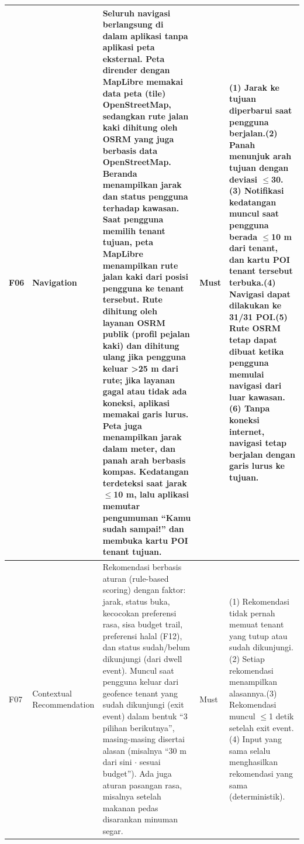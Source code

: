 \begin{longtable}{|L{0.075}|L{0.226}|L{0.299}|L{0.093}|L{0.307}|}
F06 & Navigation & Seluruh navigasi berlangsung di dalam aplikasi tanpa aplikasi peta eksternal. Peta dirender dengan MapLibre memakai data peta (tile) OpenStreetMap, sedangkan rute jalan kaki dihitung oleh OSRM yang juga berbasis data OpenStreetMap. Beranda menampilkan jarak dan status pengguna terhadap kawasan. Saat pengguna memilih tenant tujuan, peta MapLibre menampilkan rute jalan kaki dari posisi pengguna ke tenant tersebut. Rute dihitung oleh layanan OSRM publik (profil pejalan kaki) dan dihitung ulang jika pengguna keluar \textgreater{}25 m dari rute; jika layanan gagal atau tidak ada koneksi, aplikasi memakai garis lurus. Peta juga menampilkan jarak dalam meter, dan panah arah berbasis kompas. Kedatangan terdeteksi saat jarak \(\le\)10 m, lalu aplikasi memutar pengumuman ``Kamu sudah sampai!'' dan membuka kartu POI tenant tujuan. & Must & (1) Jarak ke tujuan diperbarui saat pengguna berjalan.\newline (2) Panah menunjuk arah tujuan dengan deviasi \(\le\)30\textdegree{}.\newline (3) Notifikasi kedatangan muncul saat pengguna berada \(\le\)10 m dari tenant, dan kartu POI tenant tersebut terbuka.\newline (4) Navigasi dapat dilakukan ke 31/31 POI.\newline (5) Rute OSRM tetap dapat dibuat ketika pengguna memulai navigasi dari luar kawasan.\newline (6) Tanpa koneksi internet, navigasi tetap berjalan dengan garis lurus ke tujuan. \\ \hline
F07 & Contextual Recommendation & Rekomendasi berbasis aturan (rule-based scoring) dengan faktor: jarak, status buka, kecocokan preferensi rasa, sisa budget trail, preferensi halal (F12), dan status sudah/belum dikunjungi (dari dwell event). Muncul saat pengguna keluar dari geofence tenant yang sudah dikunjungi (exit event) dalam bentuk ``3 pilihan berikutnya'', masing-masing disertai alasan (misalnya ``30 m dari sini \(\cdot\) sesuai budget''). Ada juga aturan pasangan rasa, misalnya setelah makanan pedas disarankan minuman segar. & Must & (1) Rekomendasi tidak pernah memuat tenant yang tutup atau sudah dikunjungi.\newline (2) Setiap rekomendasi menampilkan alasannya.\newline (3) Rekomendasi muncul \(\le\)1 detik setelah exit event.\newline (4) Input yang sama selalu menghasilkan rekomendasi yang sama (deterministik). \\ \hline

\end{longtable}
